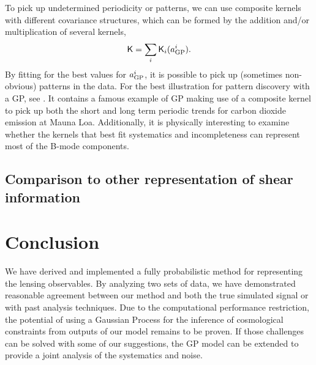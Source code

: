 To pick up undetermined periodicity or patterns, 
we can use composite kernels with different covariance structures, 
which can be formed by the addition and/or multiplication of several kernels,
\begin{equation}
	\mathsf{K} = \sum_i \mathsf{K}_i(a_{\rm GP}^i).
\end{equation}
By fitting for the best values for $a_{\rm GP}^i$, it is possible  
to pick up (sometimes non-obvious) patterns in the data. 
For the best illustration for pattern discovery with a GP, see
\cite{Duvenaud2013}.
It contains a famous example of GP making use of a composite kernel to pick up both the 
short and long term periodic trends for carbon dioxide emission at Mauna Loa.
Additionally, it is physically interesting to examine whether the kernels that best 
fit systematics and incompleteness can represent most of the B-mode components. 

\subsection{Comparison to other representation of shear information}






\section{Conclusion}
We have derived and implemented a fully probabilistic method for 
representing the lensing observables. By analyzing two sets of data, 
we have demonstrated reasonable agreement between our method and both the true
simulated signal or with past analysis techniques.  
Due to the computational performance restriction,  
the potential of using a Gaussian Process for the inference of cosmological
constraints from outputs of our model remains to be proven. 
If those challenges can be solved with some of our
suggestions, the GP model can be 
extended to provide a joint analysis of the systematics and noise. 


